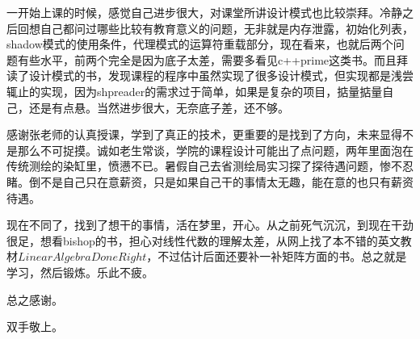 \documentclass[a4paper,16pt,UTF8]{article}
\begin{document}
        一开始上课的时候，感觉自己进步很大，对课堂所讲设计模式也比较崇拜。冷静之后回想自己都问过哪些比较有教育意义的问题，无非就是内存泄露，初始化列表，shadow模式的使用条件，代理模式的运算符重载部分，现在看来，也就后两个问题有些水平，前两个完全是因为底子太差，需要多看见c++prime这类书。而且拜读了设计模式的书，发现课程的程序中虽然实现了很多设计模式，但实现都是浅尝辄止的实现，因为shpreader的需求过于简单，如果是复杂的项目，掂量掂量自己，还是有点悬。当然进步很大，无奈底子差，还不够。

        感谢张老师的认真授课，学到了真正的技术，更重要的是找到了方向，未来显得不是那么不可捉摸。诚如老生常谈，学院的课程设计可能出了点问题，两年里面泡在传统测绘的染缸里，愤懑不已。暑假自己去省测绘局实习探了探待遇问题，惨不忍睹。倒不是自己只在意薪资，只是如果自己干的事情太无趣，能在意的也只有薪资待遇。
        
        现在不同了，找到了想干的事情，活在梦里，开心。从之前死气沉沉，到现在干劲很足，想看bishop的书，担心对线性代数的理解太差，从网上找了本不错的英文教材$Linear Algebra Done Right$，不过估计后面还要补一补矩阵方面的书。总之就是学习，然后锻炼。乐此不疲。

        总之感谢。
        
        双手敬上。


        

        
\end{document}

